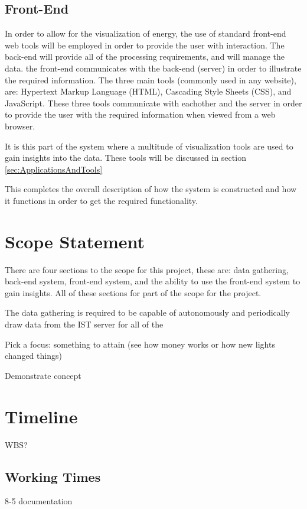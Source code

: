 \documentclass[12pt,onecolumn]{IEEEtran}
\begin{document}
\subsection{Front-End} \label{sec:FrontEnd}
In order to allow for the visualization of energy, the use of standard front-end web tools will be employed in order to provide the user with interaction. 
The back-end will provide all of the processing requirements, and will manage the data. the front-end communicates with the back-end (server) in order to illustrate the required information.
The three main tools (commonly used in any website), are: Hypertext Markup Language (HTML), Cascading Style Sheets (CSS), and JavaScript. 
These three tools communicate with eachother and the server in order to provide the user with the required information when viewed from a web browser. 

It is this part of the system where a multitude of visualization tools are used to gain insights into the data. These tools will be discussed in section \ref{sec:ApplicationsAndTools}

This completes the overall description of how the system is constructed and how it functions in order to get the required functionality.


\section{Scope Statement} \label{sec:ScopeStatement}
There are four sections to the scope for this project, these are: data gathering, back-end system, front-end system, and the ability to use the front-end system to gain insights. All of these sections for part of the scope for the project. 

The data gathering is required to be capable of autonomously and periodically draw data from the IST server for all of the 

Pick a focus: something to attain (see how money works or how new lights changed things)

Demonstrate concept


\section{Timeline} \label{sec:Timeline}
WBS?

\subsection{Working Times} \label{sec:WorkingTimes}
8-5
documentation
\end{document}
